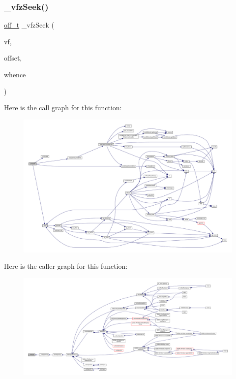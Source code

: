 \subsubsection{\texorpdfstring{\+\_\+vfz\+Seek()}{\_vfzSeek()}}
{\footnotesize\ttfamily \mbox{\hyperlink{__builder_8h_a53066be3c3a28d8b8ccb3dc95c1e49b1}{off\+\_\+t}} \+\_\+vfz\+Seek (\begin{DoxyParamCaption}\item[{struct V\+File $\ast$}]{vf,  }\item[{\mbox{\hyperlink{__builder_8h_a53066be3c3a28d8b8ccb3dc95c1e49b1}{off\+\_\+t}}}]{offset,  }\item[{\mbox{\hyperlink{ioapi_8h_a787fa3cf048117ba7123753c1e74fcd6}{int}}}]{whence }\end{DoxyParamCaption})\hspace{0.3cm}{\ttfamily [static]}}

Here is the call graph for this function\+:
\nopagebreak
\begin{figure}[H]
\begin{center}
\leavevmode
\includegraphics[width=350pt]{vfs-zip_8c_a84d781da640055a7334040e6cde4dea2_cgraph}
\end{center}
\end{figure}
Here is the caller graph for this function\+:
\nopagebreak
\begin{figure}[H]
\begin{center}
\leavevmode
\includegraphics[width=350pt]{vfs-zip_8c_a84d781da640055a7334040e6cde4dea2_icgraph}
\end{center}
\end{figure}
\mbox{\label{vfs-zip_8c_a731254500de7ab9fe9d441dbe8467f77}} 
